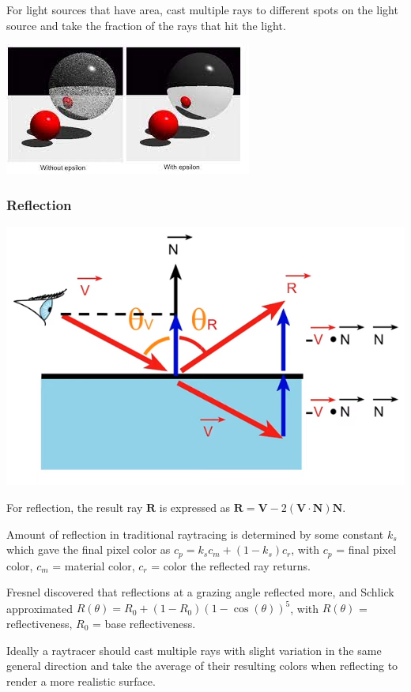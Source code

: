 \documentclass[12pt]{article}
\begin{document}
For light sources that have area, cast multiple rays to different spots
on the light source and take the fraction of the rays that hit the light.

\includegraphics{images/epsilon-vs-no-epsilon.jpeg}

\subsubsection{Reflection}

\includegraphics[scale=2]{images/reflection.png}

For reflection, the result ray $\bm R$ is expressed as
$\bm R = \bm V - 2(\bm V \cdot \bm N) \bm N$.

Amount of reflection in traditional raytracing is determined by some
constant $k_s$ which gave the final pixel color as $c_p = k_sc_m
+ (1-k_s)c_r$, with $c_p$ = final pixel color, $c_m$ = material color,
$c_r$ = color the reflected ray returns.

Fresnel discovered that reflections at a grazing angle reflected more,
and Schlick approximated $R(\theta) = R_0 + (1-R_0)(1-\cos(\theta))^5$,
with $R(\theta)$ = reflectiveness, $R_0$ = base reflectiveness.

Ideally a raytracer should cast multiple rays with slight variation in
the same general direction and take the average of their resulting colors
when reflecting to render a more realistic surface.
\end{document}
